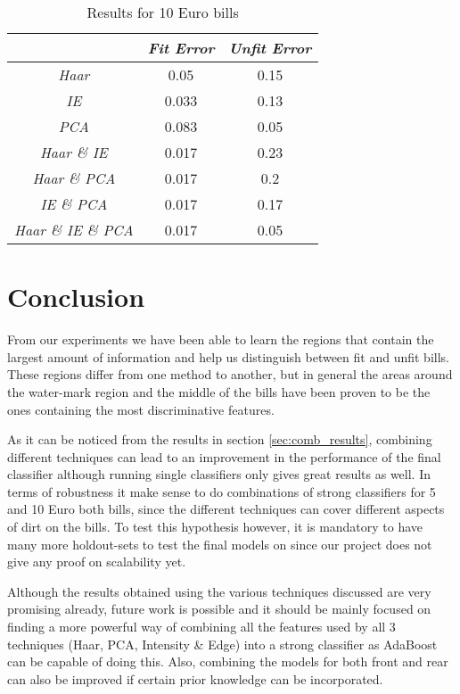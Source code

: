 \documentclass[11pt,twocolumn]{article}
\begin{document}
			\begin{table}[!htbp]
				\caption{Results for 10 Euro bills}
				\selectfont\small
				\label{table10}
				\centering 
				\begin{tabular}{ | c | c | c|}
					\hline\hline & \emph{Fit Error} & \emph{Unfit Error} \\ [0.5ex]\hline 
					\emph{Haar} & 0.05 & 0.15 \\ [0.5ex]\hline
					\emph{IE} & 0.033 & 0.13 \\ [0.5ex]\hline
					\emph{PCA} & 0.083 & 0.05 \\ [0.5ex]\hline
					\emph{Haar \& IE} & 0.017 & 0.23 \\ [0.5ex]\hline
					\emph{Haar \& PCA} & 0.017 & 0.2 \\ [0.5ex]\hline
					\emph{IE \& PCA} & 0.017 & 0.17 \\ [0.5ex]\hline
					\emph{Haar \& IE \& PCA} & 0.017 & 0.05 \\ [0.5ex]\hline
				\end{tabular} 
				\label{table:nonlin10eur} 
			\end{table}		
			

	\section{Conclusion}\label{sec:conclusion}
		From our experiments we have been able to learn the regions that contain the largest amount of information and help us distinguish between fit and unfit bills. These regions differ from one method to another, but in general the areas around the water-mark region and the middle of the bills have been proven to be the ones containing the most discriminative features.
		
		As it can be noticed from the results in section \ref{sec:comb_results}, combining different techniques can lead to an improvement in the performance of the final classifier although running single classifiers only gives great results as well. In terms of robustness it make sense to do combinations of strong classifiers for 5 and 10 Euro both bills, since the different techniques can cover different aspects of dirt on the bills. To test this hypothesis however, it is mandatory to have many more holdout-sets to test the final models on since our project does not give any proof on scalability yet.

		Although the results obtained using the various techniques discussed are very promising already, future work is possible and it should be mainly focused on finding a more powerful way of combining all the features used by all 3 techniques (Haar, PCA, Intensity \& Edge) into a strong classifier as AdaBoost can be capable of doing this. Also, combining the models for both front and rear can also be improved if certain prior knowledge can be incorporated.
		
\end{document}
